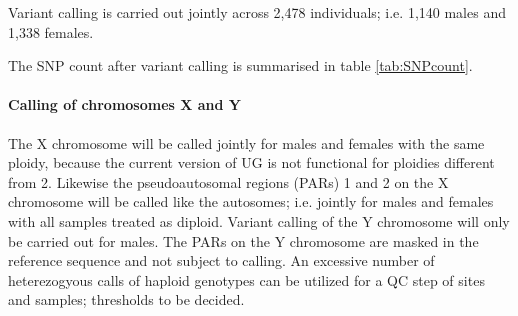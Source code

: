 
%

Variant calling is carried out jointly across 2,478 individuals; i.e. 1,140 males and 1,338 females.

The SNP count after variant calling is summarised in table \ref{tab:SNPcount}.

\paragraph{Calling of chromosomes X and Y}
The X chromosome will be called jointly for males and females with the same ploidy, because the current version of \gls{UG} is not functional for ploidies different from 2. Likewise the pseudoautosomal regions (PARs) 1 and 2 on the X chromosome will be called like the autosomes; i.e. jointly for males and females with all samples treated as diploid. Variant calling of the Y chromosome will only be carried out for males. The PARs on the Y chromosome are masked in the reference sequence and not subject to calling. An excessive number of heterezogyous calls of haploid genotypes can be utilized for a QC step of sites and samples; thresholds to be decided.

%

